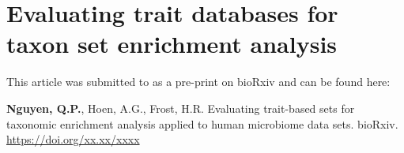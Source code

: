 \chapter{Evaluating trait databases for taxon set enrichment analysis}

This article was submitted to as a pre-print on bioRxiv and can be found here: 

\begin{center}
\justifying
\noindent \textbf{Nguyen, Q.P.}, Hoen, A.G., Frost, H.R. Evaluating trait-based sets for taxonomic enrichment analysis applied to human microbiome data sets. bioRxiv. \url{https://doi.org/xx.xx/xxxx}
\end{center}